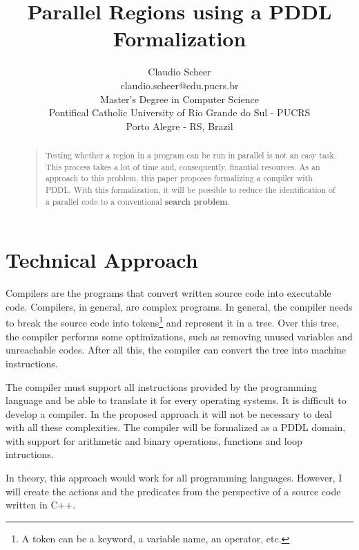 \documentclass[letterpaper]{article}
\begin{document}
\title{Parallel Regions using a PDDL Formalization}
\author{Claudio Scheer\\
  claudio.scheer@edu.pucrs.br\\
  Master's Degree in Computer Science\\
  Pontifical Catholic University of Rio Grande do Sul - PUCRS\\
  Porto Alegre - RS, Brazil\\
}
\maketitle


\begin{abstract}
  \begin{quote}
    Testing whether a region in a program can be run in parallel is not an easy task. This process takes a lot of time and, consequently, finantial resources. As an approach to this problem, this paper proposes formalizing a compiler with PDDL. With this formalization, it will be possible to reduce the identification of a parallel code to a conventional \textbf{search problem}.
  \end{quote}
\end{abstract}


\noindent 


\section{Technical Approach}

Compilers are the programs that convert written source code into executable code. Compilers, in general, are complex programs. In general, the compiler needs to break the source code into tokens\footnote{A token can be a keyword, a variable name, an operator, etc.} and represent it in a tree. Over this tree, the compiler performs some optimizations, such as removing unused variables and unreachable codes. After all this, the compiler can convert the tree into machine instructions.

The compiler must support all instructions provided by the programming language and be able to translate it for every operating systems. It is difficult to develop a compiler. In the proposed approach it will not be necessary to deal with all these complexities. The compiler will be formalized as a PDDL domain, with support for arithmetic and binary operations, functions and loop intructions.

In theory, this approach would work for all programming languages. However, I will create the actions and the predicates from the perspective of a source code written in C++.
\end{document}

